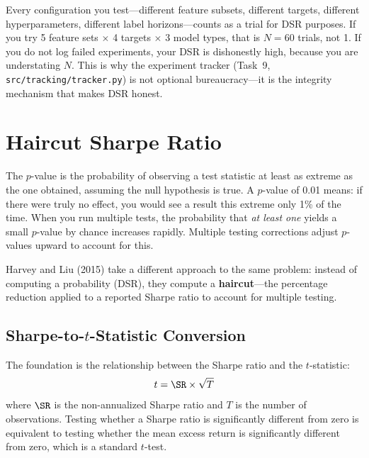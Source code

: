 \begin{warning}
Every configuration you test---different feature subsets, different targets, different hyperparameters, different label horizons---counts as a trial for DSR purposes. If you try 5 feature sets $\times$ 4 targets $\times$ 3 model types, that is $N = 60$ trials, not 1. If you do not log failed experiments, your DSR is dishonestly high, because you are understating $N$. This is why the experiment tracker (Task~9, \texttt{src/tracking/tracker.py}) is not optional bureaucracy---it is the integrity mechanism that makes DSR honest.
\end{warning}

\section{Haircut Sharpe Ratio}
\label{sec:haircut-sharpe}

\begin{prereq}
The $p$-value is the probability of observing a test statistic at least as extreme as the one obtained, assuming the null hypothesis is true. A $p$-value of 0.01 means: if there were truly no effect, you would see a result this extreme only 1\% of the time. When you run multiple tests, the probability that \emph{at least one} yields a small $p$-value by chance increases rapidly. Multiple testing corrections adjust $p$-values upward to account for this.
\end{prereq}

Harvey and Liu (2015) take a different approach to the same problem: instead of computing a probability (DSR), they compute a \textbf{haircut}---the percentage reduction applied to a reported Sharpe ratio to account for multiple testing.

\subsection{Sharpe-to-$t$-Statistic Conversion}

The foundation is the relationship between the Sharpe ratio and the $t$-statistic:
\begin{equation}
t = \SR \times \sqrt{T}
\label{eq:sr-to-t}
\end{equation}
where $\SR$ is the non-annualized Sharpe ratio and $T$ is the number of observations. Testing whether a Sharpe ratio is significantly different from zero is equivalent to testing whether the mean excess return is significantly different from zero, which is a standard $t$-test.


